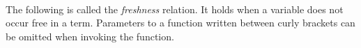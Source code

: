\documentclass{entcs}
\begin{document}

\begin{code}%
\>  \AgdaSymbol{:}  \<%
\\
\>[0]\<[2]%
\>[2] \<[7]%
\>[7]\AgdaSymbol{:}    \<[18]%
\>[18]\<%
\\
\>[0]\<[2]%
\>[2] \<[7]%
\>[7]\AgdaSymbol{:}      \<[19]%
\>[19]\<%
\\
\>[0]\<[2]%
\>[2] \<[7]%
\>[7]\AgdaSymbol{:}      \<%
\end{code}


The following is called the \emph{freshness} relation. It holds when a variable does not occur free in a term.
Parameters to a function written between curly brackets can be omitted when invoking the function.

\end{document}
